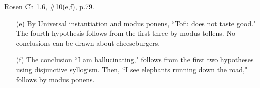 \documentclass[12pt,addpoints]{exam}
\begin{document}
\begin{questions}
\question Rosen Ch 1.6, \#10(e,f), p.79.
    \begin{solution}
    \begin{itemize}
        \item[(e)]  By Universal instantiation and modus ponens, ``Tofu does not taste good." The fourth hypothesis follows from the first three by modus tollens.  No conclusions can be drawn about cheeseburgers.
        \item[(f)] The conclusion ``I am hallucinating," follows from the first two hypotheses using disjunctive syllogism.  Then, ``I see elephants running down the road," follows by modus ponens.
    \end{itemize}
    \end{solution}


\end{questions}
\end{document}
